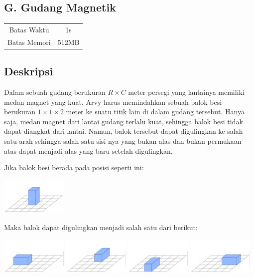 \documentclass{article}
\begin{document}
\begin{center}
    \section*{G. Gudang Magnetik}

    \begin{tabular}{ | c c | }
        \hline
        Batas Waktu  & 1s \\
        Batas Memori & 512MB \\
        \hline
    \end{tabular}
\end{center}

\subsection*{Deskripsi}
Dalam sebuah gudang berukuran $R \times C$ meter persegi yang lantainya memiliki medan magnet yang kuat, Arvy harus memindahkan sebuah balok besi berukuran $1 \times 1 \times 2$ meter ke suatu titik lain di dalam gudang tersebut.
Hanya saja, medan magnet dari lantai gudang terlalu kuat, sehingga balok besi tidak dapat diangkat dari lantai.
Namun, balok tersebut dapat digulingkan ke salah satu arah sehingga salah satu sisi nya yang bukan alas dan bukan permukaan atas dapat menjadi alas yang baru setelah digulingkan.

Jika balok besi berada pada posisi seperti ini:

\begin{center}
    \includegraphics[width=120px]{balok-1-awal}
\end{center}

Maka balok dapat digulingkan menjadi salah satu dari berikut:

\includegraphics[width=120px]{balok-1-kiri}
\includegraphics[width=120px]{balok-1-belakang}
\includegraphics[width=120px]{balok-1-depan}
\includegraphics[width=120px]{balok-1-kanan}
\end{document}
